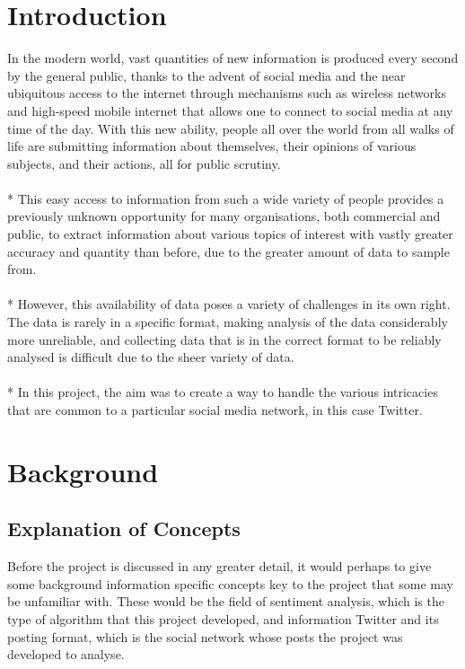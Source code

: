 \documentclass{acm_proc_article-sp}
\begin{document}
\section{Introduction}
	In the modern world, vast quantities of new information is produced every second by the general public, thanks to the advent of social media and the near ubiquitous access to the internet through mechanisms such as wireless networks and high-speed mobile internet that allows one to connect to social media at any time of the day. With this new ability, people all over the world from all walks of life are submitting information about themselves, their opinions of various subjects, and their actions, all for public scrutiny.\\
	\\*
	This easy access to information from such a wide variety of people provides a previously unknown opportunity for many organisations, both commercial and public, to extract information about various topics of interest with vastly greater accuracy and quantity than before, due  to the greater amount of data to sample from. \\
	\\*
	However, this availability of data poses a variety of challenges in its own right. The data is rarely in a specific format, making analysis of the data considerably more unreliable, and collecting data that is in the correct format to be reliably analysed is difficult due to the sheer variety of data. \\ 
	\\*
	In this project, the aim was to create a way to handle the various intricacies that are common to a particular social media network, in this case Twitter.
\section{Background}
	\subsection{Explanation of Concepts}
	Before the project is discussed in any greater detail, it would perhaps to give some background information specific concepts key to the project that some may be unfamiliar with. These would be the field of sentiment analysis, which is the type of algorithm that this project developed, and information Twitter and its posting format, which is the social network whose posts the project was developed to analyse.
\end{document}
